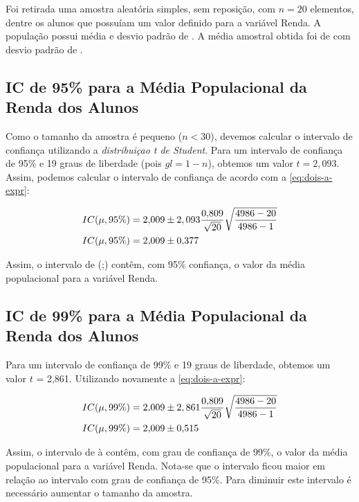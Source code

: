 

	Foi retirada uma amostra aleatória simples, sem reposição, com $n = 20$
	elementos, dentre os \TRESN alunos que possuíam um valor definido para a
	variável Renda.  A população possui média \TRESX e desvio padrão de
	\TRESSD.  A média amostral obtida foi de \TRESx com desvio padrão de
	\TRESsd.

\subsection{IC de 95\% para a Média Populacional da Renda dos Alunos}

	Como o tamanho da amostra é pequeno ($n < 30$), devemos calcular o intervalo
	de confiança utilizando a \textit{distribuiçao t de Student}. Para um
	intervalo de confiança de 95\% e 19 graus de liberdade (pois $gl = 1-n$),
	obtemos um valor $t = 2,093$.  Assim, podemos calcular o intervalo de
	confiança de acordo com a \autoref{eq:dois-a-expr}:

	\begin{align*}
		IC (\mu, 95\%) &= \num{2.009} \pm 2,093 \frac{\num{0.809}}{\sqrt{\num{20}}} \sqrt{\frac{\num{4986} - \num{20}}{\num{4986} - 1}} \\
		IC (\mu, 95\%) &= \num{2.009} \pm \num{0.377}
	\end{align*}

	Assim, o intervalo de (\TRESicmin;\TRESicmax) contêm, com 95\% confiança, o
	valor da média populacional para a variável Renda.

\subsection{IC de 99\% para a Média Populacional da Renda dos Alunos}

	Para um intervalo de confiança de 99\% e 19 graus de liberdade, obtemos
	um valor $t$ = 2,861.  Utilizando novamente a \autoref{eq:dois-a-expr}:

	\begin{align*}
		IC (\mu, 99\%) &= \num{2.009} \pm 2,861 \frac{\num{0.809}}{\sqrt{\num{20}}} \sqrt{\frac{\num{4986} - \num{20}}{\num{4986} - 1}} \\
		IC (\mu, 99\%) &= \num{2.009} \pm \num{0.515}
	\end{align*}

	Assim, o intervalo de \TRESicNoveNoveMin à \TRESicNoveNoveMax contêm,
	com grau de confiança de 99\%, o valor da média populacional para a
	variável Renda. Nota-se que o intervalo ficou maior em relação ao
	intervalo com grau de confiança de 95\%.  Para diminuir este intervalo é
	necessário aumentar o tamanho da amostra.

